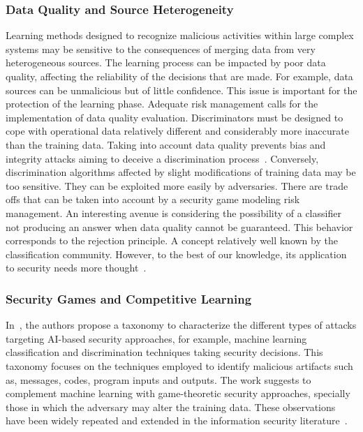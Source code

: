 \documentclass[letterpaper, 10pt, conference]{IEEEtran}
\begin{document}
\subsubsection{Data Quality and Source Heterogeneity}

Learning methods designed to recognize malicious activities within
large complex systems may be sensitive to the consequences of merging
data from very heterogeneous sources. The learning process can be
impacted by poor data quality, affecting the reliability of the
decisions that are made. For example, data sources can be unmalicious
but of little confidence. This issue is important for the protection
of the learning phase. Adequate risk management calls for the
implementation of data quality evaluation. Discriminators must be
designed to cope with operational data relatively different and
considerably more inaccurate than the training data. Taking into
account data quality prevents bias and integrity attacks aiming to
deceive a discrimination process~\cite{papernot2016distillation}.
Conversely, discrimination algorithms affected by slight modifications
of training data may be too sensitive. They can be exploited more
easily by adversaries. There are trade offs that can be taken into
account by a security game modeling risk management. An interesting
avenue is considering the possibility of a classifier not producing an
answer when data quality cannot be guaranteed. This behavior
corresponds to the rejection principle. A concept relatively well
known by the classification community. However, to the best of our
knowledge, its application to security needs more
thought~\cite{de2000reject}.

\subsubsection{Security Games and Competitive Learning}

In~\cite{barreno2010security}, the authors propose a taxonomy to
characterize the different types of attacks targeting AI-based
security approaches, for example, machine learning classification and
discrimination techniques taking security decisions. This taxonomy
focuses on the techniques employed to identify malicious artifacts
such as, messages, codes, program inputs and outputs. The work
suggests to complement machine learning with game-theoretic security
approaches, specially those in which the adversary may alter the
training data. These observations have been widely repeated and
extended in the information security
literature~\cite{papernot2016towards}.
\end{document}
